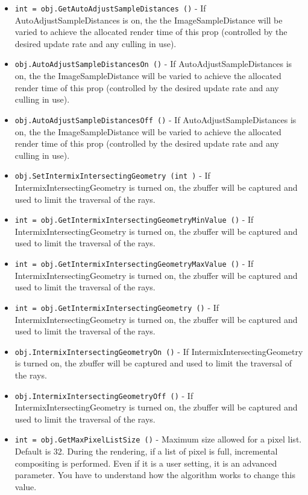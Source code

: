 \begin{itemize}
\item  \verb|int = obj.GetAutoAdjustSampleDistances ()| -  If AutoAdjustSampleDistances is on, the the ImageSampleDistance
 will be varied to achieve the allocated render time of this 
 prop (controlled by the desired update rate and any culling in
 use). 

\item  \verb|obj.AutoAdjustSampleDistancesOn ()| -  If AutoAdjustSampleDistances is on, the the ImageSampleDistance
 will be varied to achieve the allocated render time of this 
 prop (controlled by the desired update rate and any culling in
 use). 

\item  \verb|obj.AutoAdjustSampleDistancesOff ()| -  If AutoAdjustSampleDistances is on, the the ImageSampleDistance
 will be varied to achieve the allocated render time of this 
 prop (controlled by the desired update rate and any culling in
 use). 

\item  \verb|obj.SetIntermixIntersectingGeometry (int )| -  If IntermixIntersectingGeometry is turned on, the zbuffer will be
 captured and used to limit the traversal of the rays.

\item  \verb|int = obj.GetIntermixIntersectingGeometryMinValue ()| -  If IntermixIntersectingGeometry is turned on, the zbuffer will be
 captured and used to limit the traversal of the rays.

\item  \verb|int = obj.GetIntermixIntersectingGeometryMaxValue ()| -  If IntermixIntersectingGeometry is turned on, the zbuffer will be
 captured and used to limit the traversal of the rays.

\item  \verb|int = obj.GetIntermixIntersectingGeometry ()| -  If IntermixIntersectingGeometry is turned on, the zbuffer will be
 captured and used to limit the traversal of the rays.

\item  \verb|obj.IntermixIntersectingGeometryOn ()| -  If IntermixIntersectingGeometry is turned on, the zbuffer will be
 captured and used to limit the traversal of the rays.

\item  \verb|obj.IntermixIntersectingGeometryOff ()| -  If IntermixIntersectingGeometry is turned on, the zbuffer will be
 captured and used to limit the traversal of the rays.

\item  \verb|int = obj.GetMaxPixelListSize ()| -  Maximum size allowed for a pixel list. Default is 32.
 During the rendering, if a list of pixel is full, incremental compositing
 is performed. Even if it is a user setting, it is an advanced parameter.
 You have to understand how the algorithm works to change this value.


\end{itemize}
